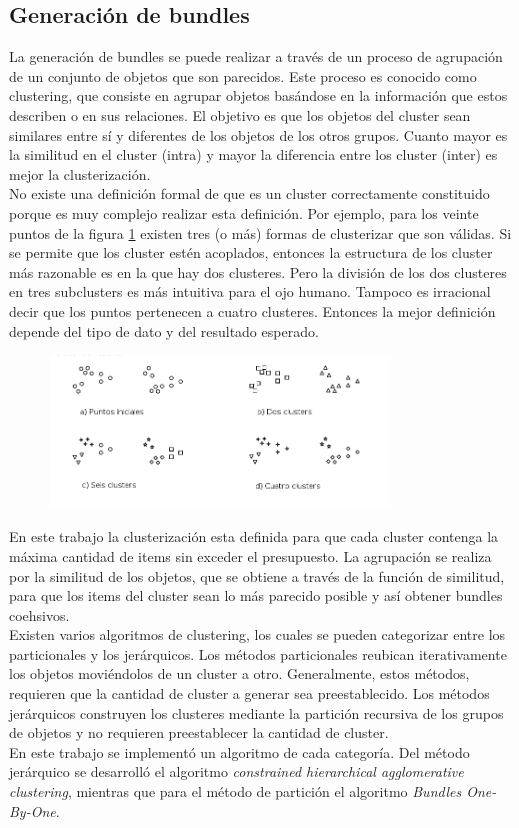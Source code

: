 \subsection{Generación de bundles}
La generación de bundles se puede realizar a través de un proceso de agrupación de un conjunto de objetos que son parecidos. Este proceso es conocido como clustering, que consiste en agrupar objetos basándose en la información que estos describen o en sus relaciones. El objetivo es que los objetos del cluster sean similares entre sí y diferentes de los objetos de los otros grupos. Cuanto mayor es la similitud en el cluster (intra) y mayor la diferencia entre los cluster (inter) es mejor la clusterización.\\
No existe una definición formal de que es un cluster correctamente constituido porque es muy complejo realizar esta definición. Por ejemplo, para los veinte puntos de la figura \ref{res:img-howToCluster} existen tres (o más) formas de clusterizar que son válidas. Si se permite que los cluster estén acoplados, entonces la estructura de los cluster más razonable es en la que hay dos clusteres. Pero la división de los dos clusteres en tres subclusters es más intuitiva para el ojo humano. Tampoco es irracional decir que los puntos pertenecen a cuatro clusteres. Entonces la mejor definición depende del tipo de dato y del resultado esperado.


\begin{figure}[H]
  \centering
   \includegraphics[width=0.8\textwidth]{img/howToCluster.png}
   \caption{}
   \label{res:img-howToCluster}
\end{figure}
En este trabajo la clusterización esta definida para que cada cluster contenga la máxima cantidad de items sin exceder el presupuesto. La agrupación se realiza por la similitud de los objetos, que se obtiene a través de la función de similitud, para que los items del cluster sean lo más parecido posible y así obtener bundles coehsivos.\\
Existen varios algoritmos de clustering, los cuales se pueden categorizar entre los particionales y los jerárquicos. Los métodos particionales reubican iterativamente los objetos moviéndolos de un cluster a otro. Generalmente, estos métodos, requieren que la cantidad de cluster a generar sea preestablecido. Los métodos jerárquicos construyen los clusteres mediante la partición recursiva de los grupos de objetos y no requieren preestablecer la cantidad de cluster.\\
En este trabajo se implementó un algoritmo de cada categoría. Del método jerárquico se desarrolló el algoritmo \textit{constrained hierarchical agglomerative clustering}, mientras que para el método de partición el algoritmo \textit{Bundles One-By-One}.\\


